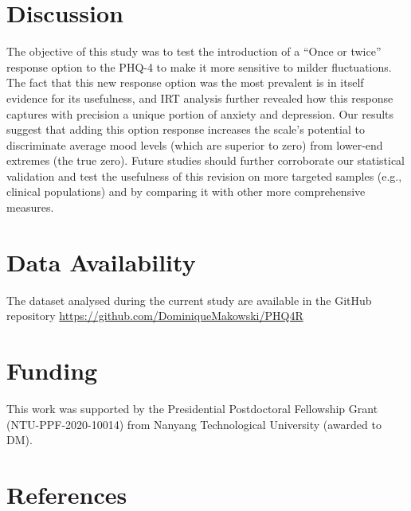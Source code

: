\documentclass[
  man,floatsintext]{apa6}
\begin{document}
\hypertarget{discussion}{%
\section{Discussion}\label{discussion}}

The objective of this study was to test the introduction of a ``Once or twice'' response option to the PHQ-4 to make it more sensitive to milder fluctuations. The fact that this new response option was the most prevalent is in itself evidence for its usefulness, and IRT analysis further revealed how this response captures with precision a unique portion of anxiety and depression. Our results suggest that adding this option response increases the scale's potential to discriminate average mood levels (which are superior to zero) from lower-end extremes (the true zero). Future studies should further corroborate our statistical validation and test the usefulness of this revision on more targeted samples (e.g., clinical populations) and by comparing it with other more comprehensive measures.

\hypertarget{data-availability}{%
\section{Data Availability}\label{data-availability}}

The dataset analysed during the current study are available in the GitHub repository \url{https://github.com/DominiqueMakowski/PHQ4R}

\hypertarget{funding}{%
\section{Funding}\label{funding}}

This work was supported by the Presidential Postdoctoral Fellowship Grant (NTU-PPF-2020-10014) from Nanyang Technological University (awarded to DM).

\newpage

\hypertarget{references}{%
\section{References}\label{references}}
\end{document}
